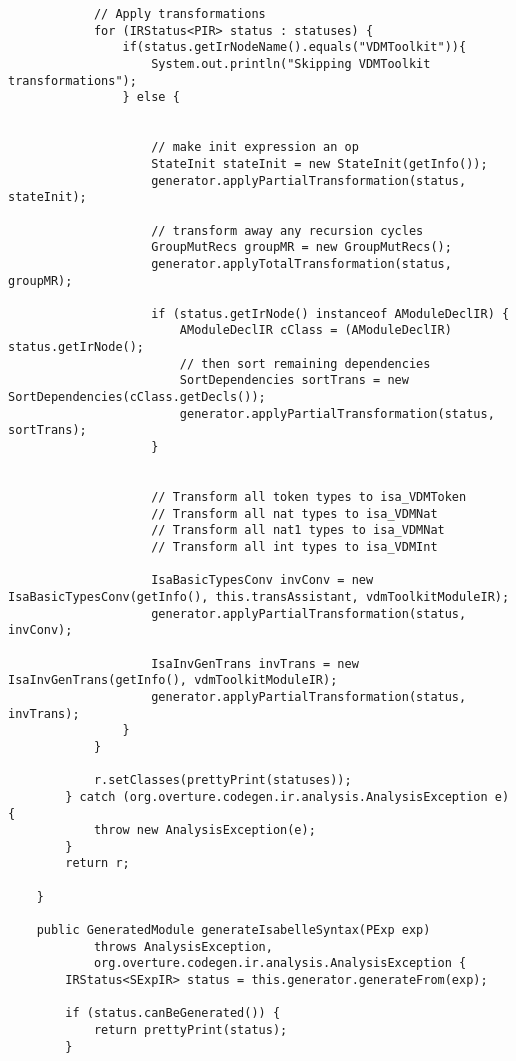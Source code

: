 \begin{appendices}
\begin{lstlisting}
            // Apply transformations
            for (IRStatus<PIR> status : statuses) {
                if(status.getIrNodeName().equals("VDMToolkit")){
                    System.out.println("Skipping VDMToolkit transformations");
                } else {


                    // make init expression an op
                    StateInit stateInit = new StateInit(getInfo());
                    generator.applyPartialTransformation(status, stateInit);

                    // transform away any recursion cycles
                    GroupMutRecs groupMR = new GroupMutRecs();
                    generator.applyTotalTransformation(status, groupMR);

                    if (status.getIrNode() instanceof AModuleDeclIR) {
                        AModuleDeclIR cClass = (AModuleDeclIR) status.getIrNode();
                        // then sort remaining dependencies
                        SortDependencies sortTrans = new SortDependencies(cClass.getDecls());
                        generator.applyPartialTransformation(status, sortTrans);
                    }

                    
                    // Transform all token types to isa_VDMToken
                    // Transform all nat types to isa_VDMNat
                    // Transform all nat1 types to isa_VDMNat
                    // Transform all int types to isa_VDMInt

                    IsaBasicTypesConv invConv = new IsaBasicTypesConv(getInfo(), this.transAssistant, vdmToolkitModuleIR);
                    generator.applyPartialTransformation(status, invConv);

                    IsaInvGenTrans invTrans = new IsaInvGenTrans(getInfo(), vdmToolkitModuleIR);
                    generator.applyPartialTransformation(status, invTrans);
                }
            }

            r.setClasses(prettyPrint(statuses));
        } catch (org.overture.codegen.ir.analysis.AnalysisException e) {
            throw new AnalysisException(e);
        }
        return r;

    }

    public GeneratedModule generateIsabelleSyntax(PExp exp)
            throws AnalysisException,
            org.overture.codegen.ir.analysis.AnalysisException {
        IRStatus<SExpIR> status = this.generator.generateFrom(exp);

        if (status.canBeGenerated()) {
            return prettyPrint(status);
        }


\end{lstlisting}
\end{appendices}
